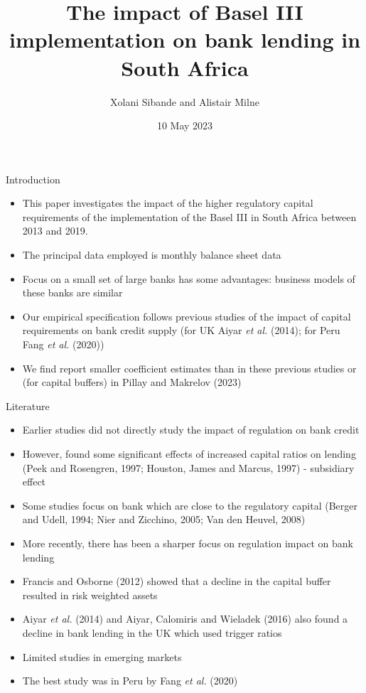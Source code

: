 \documentclass[
  14,
  ignorenonframetext,
  aspectratio=141,
]{beamer}
\title{The impact of Basel III implementation on bank lending in South
Africa}
\author{Xolani Sibande and Alistair Milne}
\date{10 May 2023}
\institute{South African Reserve Bank}
\providecommand{\tightlist}{%
  \setlength{\itemsep}{0pt}\setlength{\parskip}{0pt}}
\begin{document}
\frame{\titlepage}

\begin{frame}{Introduction}
\protect\hypertarget{introduction}{}
\begin{itemize}
\tightlist
\item
  This paper investigates the impact of the higher regulatory capital
  requirements of the implementation of the Basel III in South Africa
  between 2013 and 2019.
\item
  The principal data employed is monthly balance sheet data
\item
  Focus on a small set of large banks has some advantages: business
  models of these banks are similar
\item
  Our empirical specification follows previous studies of the impact of
  capital requirements on bank credit supply (for UK Aiyar \emph{et al.}
  (2014); for Peru Fang \emph{et al.} (2020))
\item
  We find report smaller coefficient estimates than in these previous
  studies or (for capital buffers) in Pillay and Makrelov (2023)
\end{itemize}
\end{frame}

\begin{frame}{Literature}
\protect\hypertarget{literature}{}
\begin{itemize}
\tightlist
\item
  Earlier studies did not directly study the impact of regulation on
  bank credit
\item
  However, found some significant effects of increased capital ratios on
  lending (Peek and Rosengren, 1997; Houston, James and Marcus, 1997) -
  subsidiary effect
\item
  Some studies focus on bank which are close to the regulatory capital
  (Berger and Udell, 1994; Nier and Zicchino, 2005; Van den Heuvel,
  2008)
\item
  More recently, there has been a sharper focus on regulation impact on
  bank lending
\item
  Francis and Osborne (2012) showed that a decline in the capital buffer
  resulted in risk weighted assets
\item
  Aiyar \emph{et al.} (2014) and Aiyar, Calomiris and Wieladek (2016)
  also found a decline in bank lending in the UK which used trigger
  ratios
\item
  Limited studies in emerging markets
\item
  The best study was in Peru by Fang \emph{et al.} (2020)
\end{itemize}
\end{frame}
\end{document}
